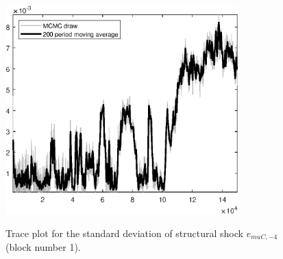 \begin{figure}[H]
\centering
  \includegraphics[width=0.8\textwidth]{BRS_sectoral_KK/graphs/TracePlot_SE_e_muC_news_blck_1}\\
    \caption{Trace plot for the standard deviation of structural shock ${e_{muC,-4}}$ (block number 1).}
\end{figure}
